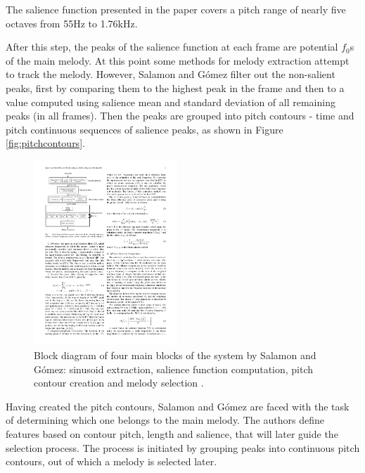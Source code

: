 The salience function presented in the paper covers a pitch range of nearly five octaves from 55Hz to 1.76kHz.

After this step, the peaks of the salience function at each frame are potential $f_{0}$s of the main melody. At this point some methods for melody extraction attempt to track the melody. However, Salamon and G\'{o}mez filter out the non-salient peaks, first by comparing them to the highest peak in the frame and then to a value computed using salience mean and standard deviation of all remaining peaks (in all frames). Then the peaks are grouped into pitch contours - time and pitch continuous sequences of salience peaks, as shown in Figure \ref{fig:pitchcontours}.

\begin{figure}
  \vspace{-30pt}

  \begin{center}
    \includegraphics[width=0.48\textwidth]{Figures/salamon4blocksdiagram}
  \end{center}
  \caption{Block diagram of four main blocks of the system by Salamon and G\'{o}mez: sinusoid extraction, salience function computation, pitch contour creation and melody selection \cite{salamon}.}
\end{figure}

Having created the pitch contours, Salamon and G\'{o}mez are faced with the task of determining which one belongs to the main melody. The authors define features based on contour pitch, length and salience, that will later guide the selection process. The process is initiated by grouping peaks into continuous pitch contours, out of which a melody is selected later. 

